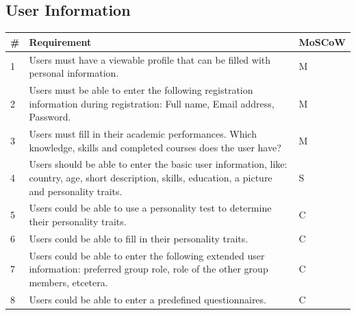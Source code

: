 \subsection{User Information}
 \begin{tabular}{ | p{0.5cm} | p{12cm} | p{2cm} | }
 \hline
 \textbf{\#} & \textbf{Requirement} & \textbf{MoSCoW} \\ \hline
 1 & Users must have a viewable profile that can be filled with personal information. & M \\ \hline
 2 & Users must be able to enter the following registration information during registration: Full name, Email address, Password. & M \\
3 & Users must fill in their academic performances. Which knowledge, skills and completed courses does the user have? & M \\ \hline
4 & Users should be able to enter the basic user information, like: country, age, short description, skills, education, a picture and personality traits. & S \\ \hline
5 & Users could be able to use a personality test to determine their personality traits. & C \\ \hline
6 & Users could be able to fill in their personality traits. & C \\ \hline
7 & Users could be able to enter the following extended user information: preferred group role, role of the other group members, etcetera. & C \\ \hline
8 & Users could be able to enter a predefined questionnaires. & C \\
 \hline
\end{tabular}

